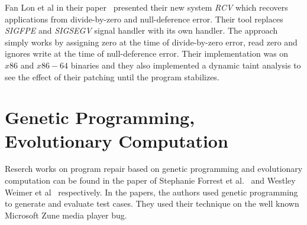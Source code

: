 Fan Lon et al in their paper~\cite{DBLP:conf/pldi/LongSR14} presented their new
system \emph{RCV} which recovers applications from divide-by-zero and
null-deference error. Their tool replaces \emph{SIGFPE} and \emph{SIGSEGV}
signal handler with its own handler. The approach simply works by assigning
zero at the time of divide-by-zero error, read zero and ignores write at the time
of null-deference error. Their implementation was on $x86$ and $x86-64$
binaries and they also implemented a dynamic taint analysis to see the effect of their
patching until the program stabilizes.

\section{Genetic Programming, Evolutionary Computation}
\label{sec:RecWorksGeneric}

Reserch works on program repair based on genetic programming and evolutionary
computation can be found in the paper of Stephanie Forrest et
al.~\cite{DBLP:conf/gecco/2009g} and Westley Weimer et
al~\cite{DBLP:journals/cacm/WeimerFGN10} respectively. In the papers, the
authors used genetic programming to generate and evaluate test cases. They used
their technique on the well known Microsoft Zune media player bug.



